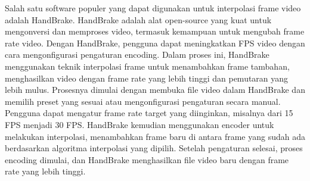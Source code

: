\begin{enumerate}
Salah satu software populer yang dapat digunakan untuk interpolasi frame video adalah HandBrake. HandBrake adalah alat open-source yang kuat untuk mengonversi dan memproses video, termasuk kemampuan untuk mengubah frame rate video. Dengan HandBrake, pengguna dapat meningkatkan FPS video dengan cara mengonfigurasi pengaturan encoding. Dalam proses ini, HandBrake menggunakan teknik interpolasi frame untuk menambahkan frame tambahan, menghasilkan video dengan frame rate yang lebih tinggi dan pemutaran yang lebih mulus. Prosesnya dimulai dengan membuka file video dalam HandBrake dan memilih preset yang sesuai atau mengonfigurasi pengaturan secara manual. Pengguna dapat mengatur frame rate target yang diinginkan, misalnya dari 15 FPS menjadi 30 FPS. HandBrake kemudian menggunakan encoder untuk melakukan interpolasi, menambahkan frame baru di antara frame yang sudah ada berdasarkan algoritma interpolasi yang dipilih. Setelah pengaturan selesai, proses encoding dimulai, dan HandBrake menghasilkan file video baru dengan frame rate yang lebih tinggi.


\end{enumerate}
